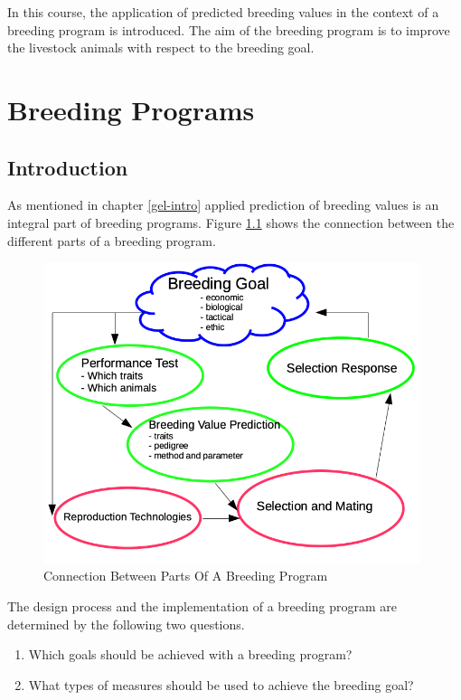 \documentclass[
]{book}
\providecommand{\tightlist}{%
  \setlength{\itemsep}{0pt}\setlength{\parskip}{0pt}}
\begin{document}
In this course, the application of predicted breeding values in the context of a breeding program is introduced. The aim of the breeding program is to improve the livestock animals with respect to the breeding goal.

\hypertarget{gel-bprog}{%
\chapter{Breeding Programs}\label{gel-bprog}}

\hypertarget{gel-bprog-intro}{%
\section{Introduction}\label{gel-bprog-intro}}

As mentioned in chapter \ref{gel-intro} applied prediction of breeding values is an integral part of breeding programs. Figure \ref{fig:bprogdiag} shows the connection between the different parts of a breeding program.

\begin{figure}[H]
\includegraphics[width=11cm]{odg/bprogdiag} \caption{Connection Between Parts Of A Breeding Program}\label{fig:bprogdiag}
\end{figure}

The design process and the implementation of a breeding program are determined by the following two questions.

\begin{enumerate}
\def\labelenumi{\arabic{enumi}.}
\tightlist
\item
  Which goals should be achieved with a breeding program?
\item
  What types of measures should be used to achieve the breeding goal?
\end{enumerate}
\end{document}
